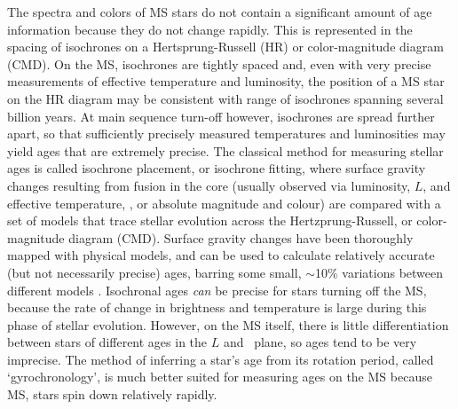 
The spectra and colors of MS stars do not contain a significant amount of age
information because they do not change rapidly.
This is represented in the spacing of isochrones on a Hertsprung-Russell (HR)
or color-magnitude diagram (CMD).
On the MS, isochrones are tightly spaced and, even with very precise
measurements of effective temperature and luminosity, the position of a MS
star on the HR diagram may be consistent with range of isochrones spanning
several billion years.
At main sequence turn-off however, isochrones are spread further apart, so
that sufficiently precisely measured temperatures and luminosities may yield
ages that are extremely precise.
The classical method for measuring stellar ages is called isochrone placement,
or isochrone fitting, where surface gravity changes resulting from fusion in
the core (usually observed via luminosity, $L$, and effective temperature,
\teff, or absolute magnitude and colour) are compared with a set of models
that trace stellar evolution across the Hertzprung-Russell, or color-magnitude
diagram (CMD).
Surface gravity changes have been thoroughly mapped with physical models, and
can be used to calculate relatively accurate (but not necessarily precise)
ages, barring some small, $\sim$10\% variations between different models
\citep[\eg][]{yi2001, dotter2008, dotter2016}.
Isochronal ages {\it can} be precise for stars turning off the MS, because the
rate of change in brightness and temperature is large during this phase of
stellar evolution.
However, on the MS itself, there is little differentiation between stars of
different ages in the $L$ and \teff\ plane, so ages tend to be very imprecise.
The method of inferring a star's age from its rotation period, called
`gyrochronology', is much better suited for measuring ages on the MS because
MS, stars spin down relatively rapidly.

